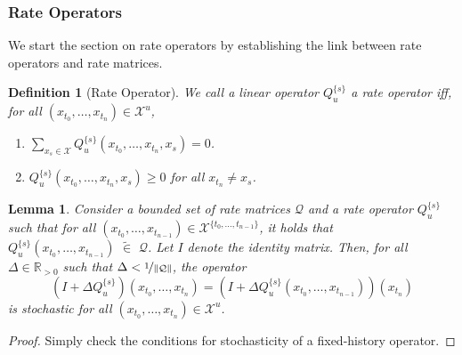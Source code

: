 \documentclass[10pt]{paper}
\newtheorem{lemma}[theorem]{Lemma}
\newtheorem{definition}{Definition}
\newcommand{\reals}{\mathbb{R}}
\newcommand{\realspos}{\reals_{>0}}
\newcommand{\states}{\mathcal{X}}
\newcommand{\gambles}{\mathcal{L}}
\newcommand{\norm}[1]{\left\lVert #1 \right\rVert}
\newcommand{\opinset}{\,\,\widetilde{\in}\,\,}
\begin{document}
\subsubsection{Rate Operators}

We start the section on rate operators by establishing the link between rate operators and rate matrices. 
\begin{definition}[Rate Operator]\label{def:rate_op}
We call a linear operator $Q_u^{\{s\}}$ a \emph{rate} operator iff, for all $(x_{t_0},\ldots,x_{t_n})\in\states^u$,
\begin{enumerate}[label=RO\arabic*:]
\item $\sum_{x_s\in\states} Q_u^{\{s\}}(x_{t_0},\ldots,x_{t_n},x_s) = 0$.
\item $Q_u^{\{s\}}(x_{t_0},\ldots,x_{t_n},x_s) \geq 0$ for all $x_{t_n}\neq x_s$.
\end{enumerate}
\end{definition}


\begin{lemma}\label{lemma:nonmarkov_fixed_history_rate_stochastic}
Consider a bounded set of rate matrices $\mathcal{Q}$ and a rate operator $Q_u^{\{s\}}$ such that for all $(x_{t_0},\ldots,x_{t_{n-1}})\in\states^{\{t_0,\ldots,t_{n-1}\}}$, it holds that $Q_u^{\{s\}}(x_{t_0},\ldots,x_{t_{n-1}})\opinset\mathcal{Q}$. Let $I$ denote the identity matrix. Then, for all $\Delta\in\realspos$ such that $\Delta<\nicefrac{1}{\norm{\mathcal{Q}}}$, the operator
\begin{equation*}
\left(I + \Delta Q_u^{\{s\}}\right)(x_{t_0},\ldots,x_{t_{n}}) = \left(I + \Delta Q_u^{\{s\}}(x_{t_0},\ldots,x_{t_{n-1}})\right)(x_{t_n})
\end{equation*}
is stochastic for all $(x_{t_0},\ldots,x_{t_{n}})\in\states^{u}$.
\end{lemma}
\begin{proof}
Simply check the conditions for stochasticity of a fixed-history operator.
\end{proof}
\end{document}

